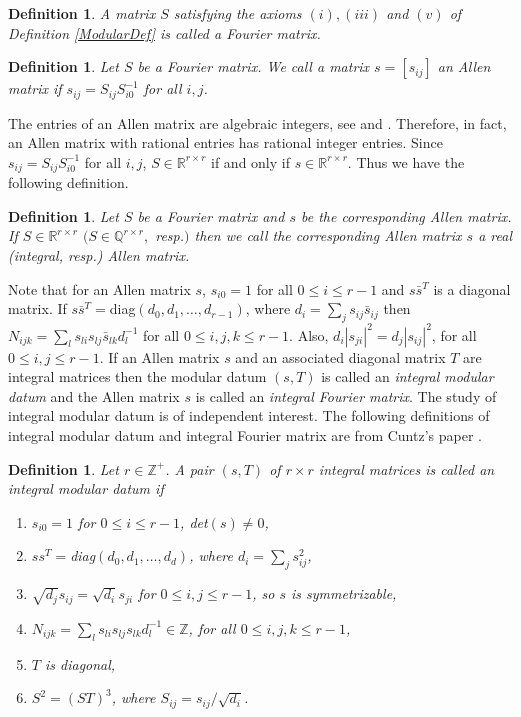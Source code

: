 \documentclass[12pt]{amsart}
\newtheorem{definition}[thm]{Definition}
\begin{document}
\begin{definition}
A matrix $S$ satisfying the axioms $(i), (iii)$ and $(v)$ of Definition \ref{ModularDef} is called a \emph{Fourier matrix}.
\end{definition}

\begin{definition} Let $S$ be a Fourier matrix. We call a matrix $s =[s_{ij}]$ an \emph{Allen matrix} if $s_{ij}= {S_{ij}}{S^{-1}_{i0}}$ for all $i,j$.
\end{definition}

The entries of an Allen matrix are algebraic integers, see \cite{MC1} and \cite[Proposition 2.17]{HIB2}. Therefore, in fact, an Allen matrix with rational entries has rational integer entries. Since $s_{ij}= {S_{ij}}{S^{-1}_{i0}}$ for all $i,j$, $S \in {{\mathbb R}}^{r\times r}$ if and only if $s \in {{\mathbb R}}^{r\times r}$. Thus we have the following definition.

\begin{definition}
Let $S$ be a Fourier matrix and $s$ be the corresponding Allen matrix. If $S \in {{\mathbb R}}^{r\times r}$ $(S \in {{\mathbb Q}}^{r\times r},$ resp.$)$ then we call the corresponding Allen matrix $s$ a real (integral, resp.) Allen matrix.
\end{definition}

Note that for an Allen matrix $s$, $s_{i0} = 1$ for all $0\leq i \leq r-1$ and  $s\bar s^T$ is a diagonal matrix. If $s \bar s^T=$diag$(d_0,d_1,\hdots, d_{r-1})$, where $d_i=\sum_js_{ij}\bar s_{ij}$ then  $N_{ijk}= \sum_l{s_{li}s_{lj}\bar s_{lk}}{d^{-1}_l}$ for all $0\leq i,j,k\leq r-1$. Also,  $d_i|s_{ji}|^2 = d_j|s_{ij}|^2$,  for all $0\leq i,j\leq r-1$.
If an Allen matrix $s$ and an associated diagonal matrix $T$ are integral matrices then the modular datum $(s,T)$ is called an \emph{integral modular datum} and the Allen matrix $s$ is called an \emph{integral Fourier matrix}. The study of integral modular datum is of independent interest. The following definitions of integral modular datum and integral Fourier matrix are from Cuntz's paper \cite{MC1}.

\begin{definition}\label{IntModularDef} Let $r\in {{\mathbb Z}}^+$. A pair $(s,T)$ of $r\times r$ integral matrices is called an integral modular datum if
\begin{enumerate}
\item $s_{i0} = 1$ for $0\leq i\leq r-1$, det$(s)\neq 0$,
\item  $ss^T=$diag$(d_0,d_1, \hdots, d_{d})$, where $d_i=\sum_js^2_{ij}$,
\item $\sqrt{d_j}s_{ij}=\sqrt{d_i}s_{ji}$ for $0\leq i,j\leq r-1$, so $s$ is symmetrizable,
\item $N_{ijk}= \sum_l {s_{li}s_{lj}s_{lk}}{d^{-1}_l} \in {{\mathbb Z}}$, for all $0\leq i,j,k\leq r-1$,
\item $T$ is diagonal,
\item $S^2 = (ST)^3$, where $S_{ij}=s_{ij}/\sqrt{d_i}$.
\end{enumerate}
 \end{definition}
\end{document}
